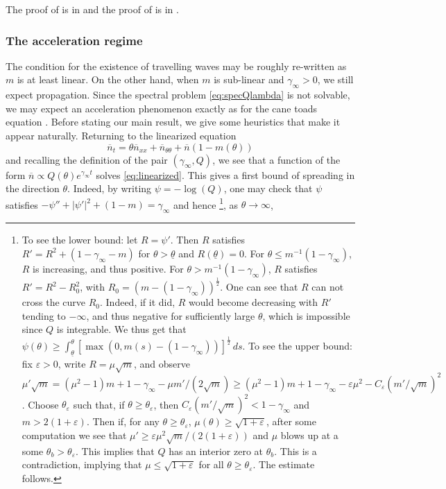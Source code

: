 \documentclass[11pt]{article}    %
\newcommand{\e}{\varepsilon}
\renewcommand{\epsilon}{\varepsilon}
\begin{document}
The proof of  is in  and the proof of  is in .




\subsubsection*{The acceleration regime}

The condition for the existence of travelling waves may be roughly re-written as $m$ is at least linear. On the other hand, when $m$ is sub-linear and $\gamma_\infty>0$, we still expect propagation. Since the spectral problem \eqref{eq:specQlambda} is not solvable, we may expect an acceleration phenomenon exactly as for the cane toads equation \cite{BCMetal,BHR_Acceleration}.  Before stating our main result, we give some heuristics that make it appear naturally.  Returning to the linearized equation  
\begin{equation}\label{eq:linearized}
	\overline n_t = \theta \overline n_{xx} + \overline n_{\theta\theta} + \overline n(1 - m(\theta))
\end{equation}
and recalling the definition of the pair $(\gamma_\infty,Q)$, we see that a function of the form $\overline{n} \propto Q(\theta) e^{\gamma_\infty t}$ solves \eqref{eq:linearized}. This gives a first bound of spreading in the direction $\theta$. Indeed, by writing $\psi = -\log(Q)$, one may check that $\psi$ satisfies $-\psi'' + |\psi'|^2 + (1-m) = \gamma_\infty$ and hence%
%
%
%
\footnote{To see the lower bound: let $R = \psi'$. Then $R$ satisfies $R' = R^2 + \left( 1 - \gamma_\infty - m \right)$ for $\theta > \underline{\theta}$ and $R(\underline{\theta}) = 0$. For $\theta \leq m^{-1}(1-\gamma_\infty)$, $R$ is increasing, and thus positive. For $\theta > m^{-1}(1-\gamma_\infty)$, $R$ satisfies $R' = R^2 - R_0^2$, with $R_0 = \left(m - \left(1 - \gamma_\infty\right)\right)^\frac12$. One can see that $R$ can not cross the curve $R_0$. Indeed, if it did, $R$ would become decreasing with $R'$ tending to $-\infty$, and thus negative for sufficiently large $\theta$, which is impossible since $Q$ is integrable. We thus get that $\psi(\theta) \geq \int_{\underline{\theta}}^\theta \left[\max\left( 0 , m(s) - \left(1 - \gamma_\infty\right) \right) \right]^\frac12 \, ds$. %
%
%
To see the upper bound: fix $\epsilon>0$, write $R = \mu\sqrt{m}$, and observe $\mu' \sqrt m = (\mu^2 -1)m + 1- \gamma_\infty - \mu m'/(2\sqrt m)\geq (\mu^2-1)m + 1-\gamma_\infty - \epsilon \mu^2 - C_\epsilon(m'/\sqrt m)^2$.  Choose $\theta_\epsilon$ such that, if $\theta \geq \theta_\e$, then $C_\epsilon (m'/\sqrt m)^2 < 1-\gamma_\infty$ and $m > 2(1+\epsilon)$.  Then if, for any $\theta \geq \theta_\epsilon$, $\mu(\theta) \geq \sqrt{1+\epsilon}$, after some computation we see that $\mu' \geq \epsilon \mu^2 \sqrt{m} / (2(1+\epsilon))$ and $\mu$ blows up at a some $\theta_b> \theta_\epsilon$.  This implies that $Q$ has an interior zero at $\theta_b$.  This is a contradiction, implying that $\mu \leq \sqrt{1+\epsilon}$ for all $\theta \geq \theta_\e$.  The estimate follows.},
%
%
%
%
as $\theta\to\infty$,
\end{document}
